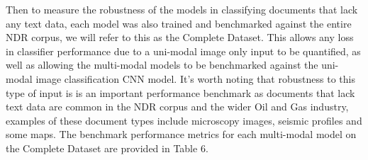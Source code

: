 \documentclass[a4paper,12pt]{article}
\begin{document}
Then to measure the robustness of the models in classifying documents that lack any text data, each model was also trained and benchmarked against the entire NDR corpus, we will refer to this as the Complete Dataset. This allows any loss in classifier performance due to a uni-modal image only input to be quantified, as well as allowing the multi-modal models to be benchmarked against the uni-modal image classification CNN model. It's worth noting that robustness to this type of input is is an important performance benchmark as documents that lack text data are common in the NDR corpus and the wider Oil and Gas industry, examples of these document types include microscopy images, seismic profiles and some maps. The benchmark performance metrics for each multi-modal model on the Complete Dataset are provided in Table 6.\\\\
\end{document}
